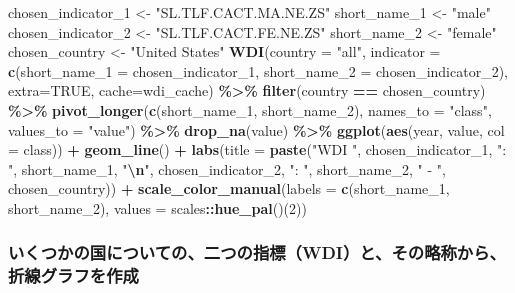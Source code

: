 \documentclass[
  xelatex, ja=standard]{bxjsbook}
\newenvironment{Shaded}{\begin{snugshade}}{\end{snugshade}}
\newcommand{\AttributeTok}[1]{\textcolor[rgb]{0.13,0.29,0.53}{#1}}
\newcommand{\ConstantTok}[1]{\textcolor[rgb]{0.56,0.35,0.01}{#1}}
\newcommand{\DecValTok}[1]{\textcolor[rgb]{0.00,0.00,0.81}{#1}}
\newcommand{\FunctionTok}[1]{\textcolor[rgb]{0.13,0.29,0.53}{\textbf{#1}}}
\newcommand{\NormalTok}[1]{#1}
\newcommand{\OtherTok}[1]{\textcolor[rgb]{0.56,0.35,0.01}{#1}}
\newcommand{\SpecialCharTok}[1]{\textcolor[rgb]{0.81,0.36,0.00}{\textbf{#1}}}
\newcommand{\StringTok}[1]{\textcolor[rgb]{0.31,0.60,0.02}{#1}}
\theoremstyle{definition}
\theoremstyle{definition}
\theoremstyle{definition}
\theoremstyle{definition}
\theoremstyle{remark}
\begin{document}
\begin{Shaded}
\begin{Highlighting}[]
\NormalTok{chosen\_indicator\_1 }\OtherTok{\textless{}{-}} \StringTok{"SL.TLF.CACT.MA.NE.ZS"}
\NormalTok{short\_name\_1 }\OtherTok{\textless{}{-}} \StringTok{"male"}
\NormalTok{chosen\_indicator\_2 }\OtherTok{\textless{}{-}} \StringTok{"SL.TLF.CACT.FE.NE.ZS"}
\NormalTok{short\_name\_2 }\OtherTok{\textless{}{-}} \StringTok{"female"}
\NormalTok{chosen\_country }\OtherTok{\textless{}{-}} \StringTok{"United States"}
\FunctionTok{WDI}\NormalTok{(}\AttributeTok{country =} \StringTok{"all"}\NormalTok{, }\AttributeTok{indicator =} \FunctionTok{c}\NormalTok{(}\AttributeTok{short\_name\_1 =}\NormalTok{ chosen\_indicator\_1, }\AttributeTok{short\_name\_2 =}\NormalTok{ chosen\_indicator\_2), }\AttributeTok{extra=}\ConstantTok{TRUE}\NormalTok{, }\AttributeTok{cache=}\NormalTok{wdi\_cache) }\SpecialCharTok{\%\textgreater{}\%} 
  \FunctionTok{filter}\NormalTok{(country }\SpecialCharTok{==}\NormalTok{ chosen\_country) }\SpecialCharTok{\%\textgreater{}\%} 
  \FunctionTok{pivot\_longer}\NormalTok{(}\FunctionTok{c}\NormalTok{(short\_name\_1, short\_name\_2), }\AttributeTok{names\_to =} \StringTok{"class"}\NormalTok{, }\AttributeTok{values\_to =} \StringTok{"value"}\NormalTok{) }\SpecialCharTok{\%\textgreater{}\%} \FunctionTok{drop\_na}\NormalTok{(value) }\SpecialCharTok{\%\textgreater{}\%}
  \FunctionTok{ggplot}\NormalTok{(}\FunctionTok{aes}\NormalTok{(year, value, }\AttributeTok{col =}\NormalTok{ class)) }\SpecialCharTok{+} \FunctionTok{geom\_line}\NormalTok{() }\SpecialCharTok{+}
  \FunctionTok{labs}\NormalTok{(}\AttributeTok{title =} \FunctionTok{paste}\NormalTok{(}\StringTok{"WDI "}\NormalTok{, chosen\_indicator\_1, }\StringTok{": "}\NormalTok{, short\_name\_1, }\StringTok{"}\SpecialCharTok{\textbackslash{}n}\StringTok{"}\NormalTok{, chosen\_indicator\_2, }\StringTok{": "}\NormalTok{, short\_name\_2, }\StringTok{" {-} "}\NormalTok{, chosen\_country)) }\SpecialCharTok{+}
  \FunctionTok{scale\_color\_manual}\NormalTok{(}\AttributeTok{labels =} \FunctionTok{c}\NormalTok{(short\_name\_1, short\_name\_2), }\AttributeTok{values =}\NormalTok{ scales}\SpecialCharTok{::}\FunctionTok{hue\_pal}\NormalTok{()(}\DecValTok{2}\NormalTok{))}
\end{Highlighting}
\end{Shaded}

\hypertarget{ux3044ux304fux3064ux304bux306eux56fdux306bux3064ux3044ux3066ux306eux4e8cux3064ux306eux6307ux6a19wdiux3068ux305dux306eux7565ux79f0ux304bux3089ux6298ux7ddaux30b0ux30e9ux30d5ux3092ux4f5cux6210}{%
\subsubsection{いくつかの国についての、二つの指標（WDI）と、その略称から、折線グラフを作成}\label{ux3044ux304fux3064ux304bux306eux56fdux306bux3064ux3044ux3066ux306eux4e8cux3064ux306eux6307ux6a19wdiux3068ux305dux306eux7565ux79f0ux304bux3089ux6298ux7ddaux30b0ux30e9ux30d5ux3092ux4f5cux6210}}
\end{document}
